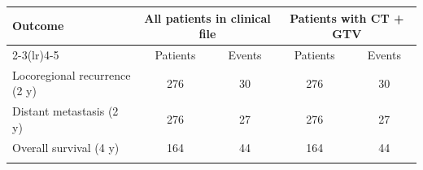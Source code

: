 \begin{tabular}{@{}lcccc@{}}
\toprule
Outcome & \multicolumn{2}{c}{All patients in clinical file} & \multicolumn{2}{c}{Patients with CT + GTV} \\
\cmidrule(lr){2-3}\cmidrule(lr){4-5}
 & Patients & Events & Patients & Events \\
\midrule
Locoregional recurrence (2 y) & 276 & 30 & 276 & 30 \\
Distant metastasis (2 y) & 276 & 27 & 276 & 27 \\
Overall survival (4 y) & 164 & 44 & 164 & 44 \\
\botrule
\end{tabular}
